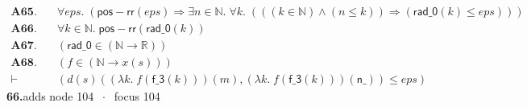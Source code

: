 \documentclass[11pt]{article}
\newcommand{\fit}[1]{\resizebox{\ifdim\width>\linewidth\linewidth\else\width\fi}{!}{#1}}
\begin{document}
\begin{align*}
  \mathbf{A65.}\quad & \forall \mathit{eps}.\; (\mathsf{pos{-}rr}(\mathit{eps}) \Rightarrow \exists n \in \mathbb{N}.\; \forall k.\; (((k \in \mathbb{N}) \wedge (n \leq k)) \Rightarrow (\mathsf{rad\_0}(k) \leq \mathit{eps}))) \\
  \mathbf{A66.}\quad & \forall k \in \mathbb{N}.\; \mathsf{pos{-}rr}(\mathsf{rad\_0}(k)) \\
  \mathbf{A67.}\quad & (\mathsf{rad\_0} \in (\mathbb{N} \to \mathbb{R})) \\
  \mathbf{A68.}\quad & (f \in (\mathbb{N} \to x(s))) \\
  \vdash\quad & (d(s)((\lambda k.\; f(\mathsf{f\_3}(k)))(m), (\lambda k.\; f(\mathsf{f\_3}(k)))(\mathsf{n\_})) \leq \mathit{eps})
\end{align*}
\medskip\noindent\textbf{66.}\quad \fit{\texttt{(lam-b)}}\hfill{\small adds node 104 $\;\cdot\;$ focus 104}\\[2pt]
\end{document}
